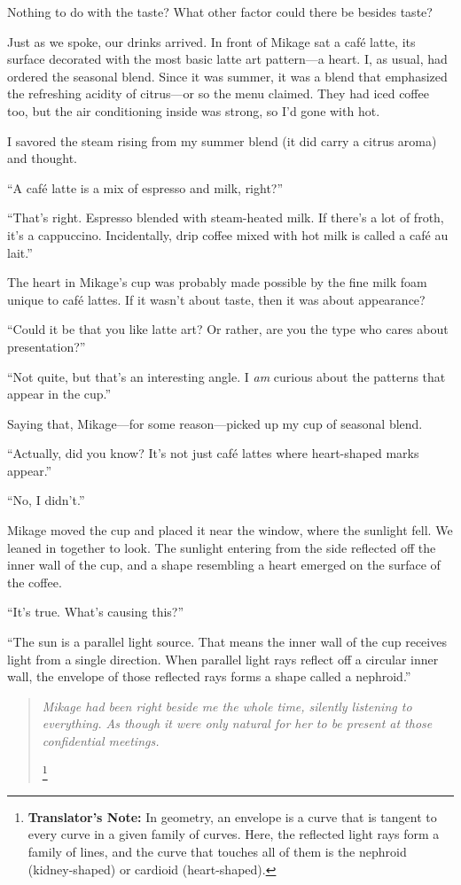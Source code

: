 \documentclass[
    a4paper,
    12pt,
    twoside,
    openany,
    UTF8,
    fontset=windows
]{ctexbook}
\begin{document}
Nothing to do with the taste? What other factor could there be besides taste?

Just as we spoke, our drinks arrived. In front of Mikage sat a café latte, its surface decorated with the most basic latte art pattern---a heart. I, as usual, had ordered the seasonal blend. Since it was summer, it was a blend that emphasized the refreshing acidity of citrus---or so the menu claimed. They had iced coffee too, but the air conditioning inside was strong, so I'd gone with hot.

I savored the steam rising from my summer blend (it did carry a citrus aroma) and thought.

``A café latte is a mix of espresso and milk, right?''

``That's right. Espresso blended with steam-heated milk. If there's a lot of froth, it's a cappuccino. Incidentally, drip coffee mixed with hot milk is called a café au lait.''

The heart in Mikage's cup was probably made possible by the fine milk foam unique to café lattes. If it wasn't about taste, then it was about appearance?

``Could it be that you like latte art? Or rather, are you the type who cares about presentation?''

``Not quite, but that's an interesting angle. I \textit{am} curious about the patterns that appear in the cup.''

Saying that, Mikage---for some reason---picked up my cup of seasonal blend.

``Actually, did you know? It's not just café lattes where heart-shaped marks appear.''

``No, I didn't.''

Mikage moved the cup and placed it near the window, where the sunlight fell. We leaned in together to look. The sunlight entering from the side reflected off the inner wall of the cup, and a shape resembling a heart emerged on the surface of the coffee.

``It's true. What's causing this?''

``The sun is a parallel light source. That means the inner wall of the cup receives light from a single direction. When parallel light rays reflect off a circular inner wall, the envelope of those reflected rays forms a shape called a nephroid.''

\begin{quote}
\textit{Mikage had been right beside me the whole time, silently listening to everything. As though it were only natural for her to be present at those confidential meetings.}

\footnote{\textbf{Translator's Note:} In geometry, an envelope is a curve that is tangent to every curve in a given family of curves. Here, the reflected light rays form a family of lines, and the curve that touches all of them is the nephroid (kidney-shaped) or cardioid (heart-shaped).}
\end{quote}
\end{document}

